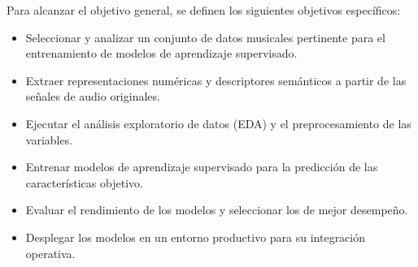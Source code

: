 Para alcanzar el objetivo general, se definen los siguientes objetivos específicos:

\begin{itemize}
  \item Seleccionar y analizar un conjunto de datos musicales pertinente para el entrenamiento de modelos de aprendizaje supervisado.
  \item Extraer representaciones numéricas y descriptores semánticos a partir de las señales de audio originales.
  \item Ejecutar el análisis exploratorio de datos (EDA) y el preprocesamiento de las variables.
  \item Entrenar modelos de aprendizaje supervisado para la predicción de las características objetivo.
  \item Evaluar el rendimiento de los modelos y seleccionar los de mejor desempeño.
  \item Desplegar los modelos en un entorno productivo para su integración operativa.
\end{itemize}


